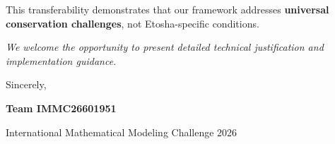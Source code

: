 This transferability demonstrates that our framework addresses \textbf{universal conservation challenges}, not Etosha-specific conditions.

\vspace{0.5cm}

\noindent \textit{We welcome the opportunity to present detailed technical justification and implementation guidance.}

\vspace{0.5cm}

Sincerely,

\vspace{1cm}

\textbf{Team IMMC26601951}

International Mathematical Modeling Challenge 2026
